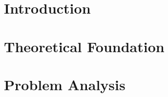 \documentclass[12pt]{report}
\begin{document}

\tableofcontents

% 

\chapter{Introduction}






\chapter{Theoretical Foundation}\label{chap:2}




\chapter{Problem Analysis}

% 
 




\printbibliography
\end{document}

